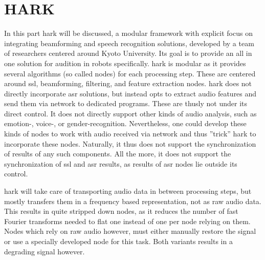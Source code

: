 
\section{HARK}
\label{related:frameworks}
In this part \gls{hark} \cite{Nakadai_2017jrm} will be discussed, a modular framework with explicit focus on integrating beamforming and speech recognition solutions, developed by a team of researchers centered around Kyoto University.
Its goal is to provide an all in one solution for audition in robots specifically.
\gls{hark} is modular as it provides several algorithms (so called nodes) for each processing step.
These are centered around \gls{ssl}, beamforming, filtering, and feature extraction nodes.
\gls{hark} does not directly incorporate \gls{asr} solutions, but instead opts to extract audio features and send them via network to dedicated programs.
These are thusly not under its direct control.
It does not directly support other kinds of audio analysis, such as emotion-, voice-, or gender-recognition.
Nevertheless, one could develop these kinds of nodes to work with audio received via network and thus ''trick'' \gls{hark} to incorporate these nodes.
Naturally, it thus does not support the synchronization of results of any such components.
All the more, it does not support the synchronization of \gls{ssl} and \gls{asr} results, as results of \gls{asr} nodes lie outside its control.

\gls{hark} will take care of transporting audio data in between processing steps, but mostly transfers them in a frequency based representation, not as raw audio data.
This results in quite stripped down nodes, as it reduces the number of fast Fourier transforms needed to flat one instead of one per node relying on them.
Nodes which rely on raw audio however, must either manually restore the signal or use a specially developed node for this task.
Both variants results in a degrading signal however.

